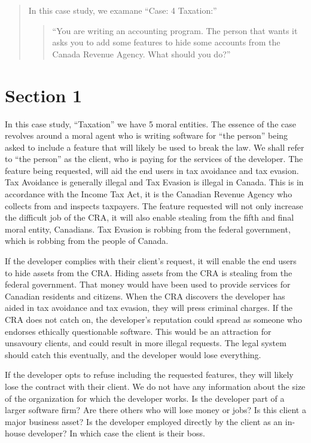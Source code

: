 \begin{abstract}
In this case study, we examane ``Case: 4 Taxation:'' 
\begin{quote}
``You are writing an accounting program. The person that wants it asks you to add some features 
to hide some accounts from the Canada Revenue Agency. What should you do?''
\end{quote}
\end{abstract}

\section{Section 1}

In this case study, ``Taxation'' we have 5 moral entities. The essence of the case revolves around a moral agent who is writing software for ``the person'' being asked to include a feature that will likely be used to break the law. We shall refer to ``the person'' as the client, who is paying for the services of the developer. The feature being requested, will aid the end users in tax avoidance and tax evasion. Tax Avoidance is generally illegal and Tax Evasion is illegal in Canada. This is in accordance with the Income Tax Act, it is the Canadian Revenue Agency who collects from and inspects taxpayers. The feature requested will not only increase the difficult job of the CRA, it will also enable stealing from the fifth and final moral entity, Canadians. Tax Evasion is robbing from the federal government, which is robbing from the people of Canada.


If the developer complies with their client's request, it will enable the end users to hide assets from the CRA. Hiding assets from the CRA is stealing from the federal government. That money would have been used to provide services for Canadian residents and citizens. When the CRA discovers the developer has aided in tax avoidance and tax evasion, they will press criminal charges. If the CRA does not catch on, the developer’s reputation could spread as someone who endorses ethically questionable software. This would be an attraction for unsavoury clients, and could result in more illegal requests. The legal system should catch this eventually, and the developer would lose everything.  


If the developer opts to refuse including the requested features, they will likely lose the contract with their client. We do not have any information about the size of the organization for which the developer works. Is the developer part of a larger software firm? Are there others who will lose money or jobs? Is this client a major business asset? Is the developer employed directly by the client as an in-house developer? In which case the client is their boss.
